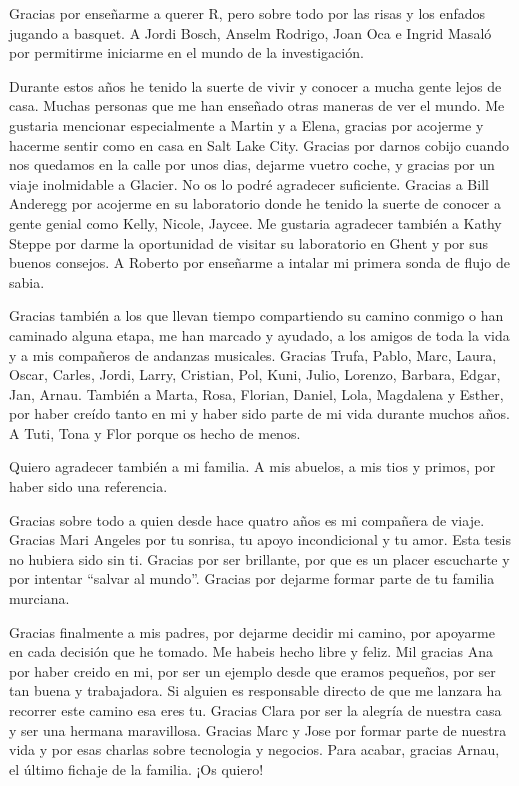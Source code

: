 \documentclass[11pt,twoside]{reedthesis}
\begin{document}
\begin{acknowledgements}
    Gracias por enseñarme a querer R, pero sobre todo por las risas y los
    enfados jugando a basquet. A Jordi Bosch, Anselm Rodrigo, Joan Oca e
    Ingrid Masaló por permitirme iniciarme en el mundo de la
    investigación.\par
    Durante estos años he tenido la suerte de vivir y conocer a mucha gente
    lejos de casa. Muchas personas que me han enseñado otras maneras de ver
    el mundo. Me gustaria mencionar especialmente a Martin y a Elena,
    gracias por acojerme y hacerme sentir como en casa en Salt Lake City.
    Gracias por darnos cobijo cuando nos quedamos en la calle por unos dias,
    dejarme vuetro coche, y gracias por un viaje inolmidable a Glacier. No
    os lo podré agradecer suficiente. Gracias a Bill Anderegg por acojerme
    en su laboratorio donde he tenido la suerte de conocer a gente genial
    como Kelly, Nicole, Jaycee. Me gustaria agradecer también a Kathy Steppe
    por darme la oportunidad de visitar su laboratorio en Ghent y por sus
    buenos consejos. A Roberto por enseñarme a intalar mi primera sonda de
    flujo de sabia.\par
    Gracias también a los que llevan tiempo compartiendo su camino conmigo o
    han caminado alguna etapa, me han marcado y ayudado, a los amigos de
    toda la vida y a mis compañeros de andanzas musicales. Gracias Trufa,
    Pablo, Marc, Laura, Oscar, Carles, Jordi, Larry, Cristian, Pol, Kuni,
    Julio, Lorenzo, Barbara, Edgar, Jan, Arnau. También a Marta, Rosa,
    Florian, Daniel, Lola, Magdalena y Esther, por haber creído tanto en mi
    y haber sido parte de mi vida durante muchos años. A Tuti, Tona y Flor
    porque os hecho de menos.\par
    Quiero agradecer también a mi familia. A mis abuelos, a mis tios y
    primos, por haber sido una referencia.\par
    Gracias sobre todo a quien desde hace quatro años es mi compañera de
    viaje. Gracias Mari Angeles por tu sonrisa, tu apoyo incondicional y tu
    amor. Esta tesis no hubiera sido sin ti. Gracias por ser brillante, por
    que es un placer escucharte y por intentar ``salvar al mundo''. Gracias
    por dejarme formar parte de tu familia murciana.\par
    Gracias finalmente a mis padres, por dejarme decidir mi camino, por
    apoyarme en cada decisión que he tomado. Me habeis hecho libre y feliz.
    Mil gracias Ana por haber creido en mi, por ser un ejemplo desde que
    eramos pequeños, por ser tan buena y trabajadora. Si alguien es
    responsable directo de que me lanzara ha recorrer este camino esa eres
    tu. Gracias Clara por ser la alegría de nuestra casa y ser una hermana
    maravillosa. Gracias Marc y Jose por formar parte de nuestra vida y por
    esas charlas sobre tecnologia y negocios. Para acabar, gracias Arnau, el
    último fichaje de la familia. ¡Os quiero!\par
  \end{acknowledgements}
\end{document}
